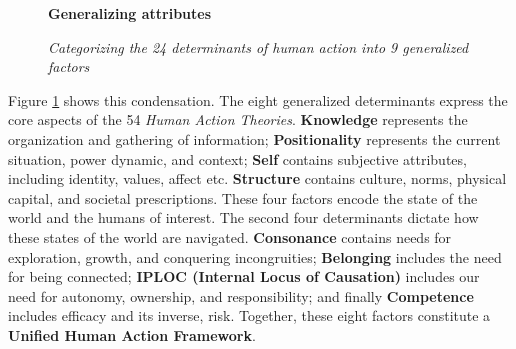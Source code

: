 \documentclass[12 pt]{article}
\begin{document}
 \begin{figure}
 	\centering
 	\textbf{Generalizing attributes}\par \medskip
 
 	\caption{\textit{Categorizing the 24 determinants of human action into 9 generalized factors}}
 		\label{fig:unif}
 \end{figure}

 Figure \ref{fig:unif} shows this condensation. The eight generalized determinants express the core aspects of the 54 \textit{Human Action Theories}. \textbf{Knowledge} represents the organization and gathering of information; \textbf{Positionality} represents the current situation, power dynamic, and context; \textbf{Self} contains subjective attributes, including identity, values, affect etc. \textbf{Structure} contains culture, norms, physical capital, and societal prescriptions. These four factors encode the state of the world and the humans of interest. The second four determinants dictate how these states of the world are navigated. \textbf{Consonance} contains needs for exploration, growth, and conquering incongruities; \textbf{Belonging} includes the need for being connected; \textbf{IPLOC (Internal Locus of Causation)} includes our need for autonomy, ownership, and responsibility; and finally \textbf{Competence} includes efficacy and its inverse, risk. Together, these eight factors constitute a \textbf{Unified Human Action Framework}. 
 
\end{document}
